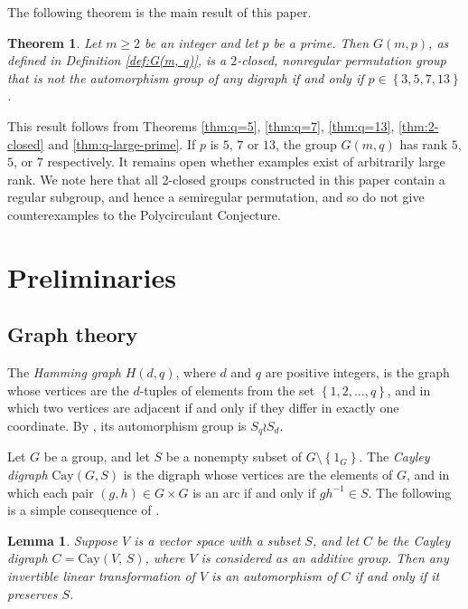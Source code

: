 \documentclass[10pt]{amsart}
\theoremstyle{definition}
\theoremstyle{plain}
\newtheorem{lemma}[lemma]{Lemma}
\theoremstyle{plain}
\theoremstyle{plain}
\newtheorem{theorem}[theorem]{Theorem}
\theoremstyle{plain}
\newcommand{\Cay}{\mathrm{Cay}}
\begin{document}
The following theorem is the main result of this paper.

\begin{theorem}
Let $m \geqslant 2$ be an integer and let $p$ be a prime. Then $G{\left(m, p \right)}$, as defined in Definition \ref{def:G(m, q)}, is a $2$-closed, nonregular permutation group that is not the automorphism group of any digraph if and only if $p \in \left\{3, 5, 7, 13 \right\}$.
\end{theorem}

This result follows from Theorems \ref{thm:q=5}, \ref{thm:q=7}, \ref{thm:q=13}, \ref{thm:2-closed} and \ref{thm:q-large-prime}. If $p$ is $5$, $7$ or $13$, the group $G{\left(m, q \right)}$ has rank $5$, $5$, or $7$ respectively. It remains open whether examples exist of arbitrarily large rank. We note here that all 2-closed groups constructed in this paper contain a regular subgroup, and hence a semiregular permutation, and so do not give counterexamples to the Polycirculant Conjecture.

\section{Preliminaries}

\subsection{Graph theory}

The \emph{Hamming graph} $H{\left(d, q \right)}$, where $d$ and $q$ are positive integers, is the graph whose vertices are the $d$-tuples of elements from the set $\left\{1, 2, \ldots, q \right\}$, and in which two vertices are adjacent if and only if they differ in exactly one coordinate. By \cite[Theorem 9.2.1]{ref:brouwer-distance}, its automorphism group is $S_q \wr S_d$.

Let $G$ be a group, and let $S$ be a nonempty subset of $G \setminus \left\{1_G \right\}$. The \emph{Cayley digraph} $\Cay{\left(G, S \right)}$ is the digraph whose vertices are the elements of $G$, and in which each pair $\left(g, h \right) \in G \times G$ is an arc if and only if $g h^{-1} \in S$. The following is a simple consequence of \cite[Lemma 3.7.3]{ref:godsil-algebraic}.

\begin{lemma} \label{lm:endomorphism-automorphism}
Suppose $V$ is a vector space with a subset $S$, and let $C$ be the Cayley digraph $C = \Cay{\left(V,\, S \right)}$, where $V$ is considered as an additive group. Then any invertible linear transformation of $V$ is an automorphism of $C$ if and only if it preserves $S$.
\end{lemma}
\end{document}
